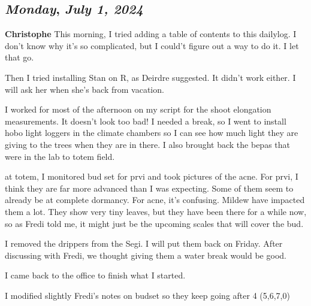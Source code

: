 \begin{center}
\section*{\month}
\end{center}

\def\day{\textit{July 1, 2024}}
\def\weekday{\textit{Monday}}
\subsection*{\weekday, \day}
\textbf {Christophe}
This morning, I tried adding a table of contents to this dailylog. I don't know why it's so complicated, but I could't figure out a way to do it. I let that go. 
\par Then I tried installing Stan on R, as Deirdre suggested. It didn't work either. I will ask her when she's back from vacation. 
\par I worked for most of the afternoon on my script for the shoot elongation measurements. It doesn't look too bad! I needed a break, so I went to install hobo light loggers in the climate chambers so I can see how much light they are giving to the trees when they are in there. I also brought back the bepas that were in the lab to totem field. 
\par at totem, I monitored bud set for prvi and took pictures of the acne. For prvi, I think they are far more advanced than I was expecting. Some of them seem to already be at complete dormancy. For acne, it's confusing. Mildew have impacted them a lot. They show very tiny leaves, but they have been there for a while now, so as Fredi told me, it might just be the upcoming scales that will cover the bud. 
\par I removed the drippers from the Segi. I will put them back on Friday. After discussing with Fredi, we thought giving them a water break would be good.
\par I came back to the office to finish what I started. 
\par I modified slightly Fredi's notes on budset so they keep going after 4 (5,6,7,0)

\def\day{\textit{July 2, 2024}}
\def\weekday{\textit{Tuesday}}
